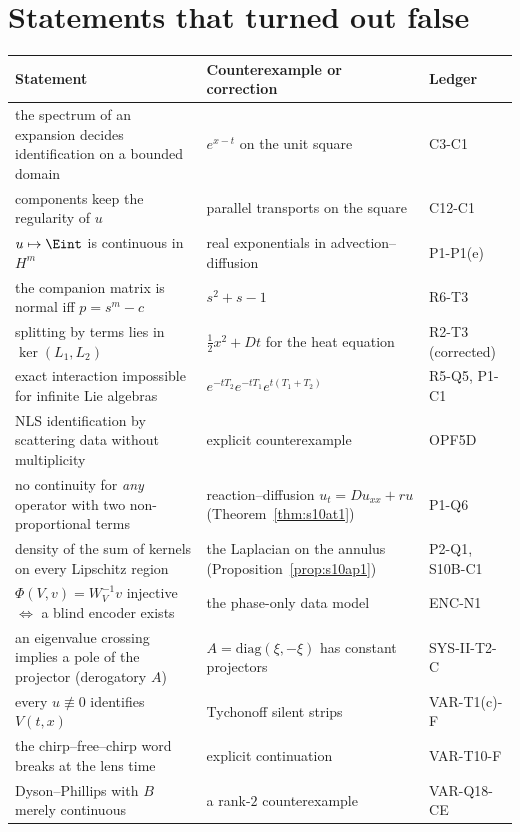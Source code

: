 \section{Statements that turned out false}

\begin{center}\small
\begin{tabular}{@{}L{5.2cm}L{6.0cm}L{2.6cm}@{}}
\toprule
Statement & Counterexample or correction & Ledger\\\midrule
the spectrum of an expansion decides identification on a bounded domain & $e^{x-t}$ on the unit square & C3-C1\\
components keep the regularity of $u$ & parallel transports on the square & C12-C1\\
$u\mapsto\Eint$ is continuous in $H^m$ & real exponentials in advection--diffusion & P1-P1(e)\\
the companion matrix is normal iff $p=s^m-c$ & $s^2+s-1$ & R6-T3\\
splitting by terms lies in $\ker(L_1,L_2)$ & $\tfrac12x^2+Dt$ for the heat equation & R2-T3 (corrected)\\
exact interaction impossible for infinite Lie algebras & $e^{-tT_2}e^{-tT_1}e^{t(T_1+T_2)}$ & R5-Q5, P1-C1\\
NLS identification by scattering data without multiplicity & explicit counterexample & OPF5D\\
no continuity for \emph{any} operator with two non-proportional terms & reaction--diffusion $u_t=Du_{xx}+ru$ (Theorem~\ref{thm:s10at1}) & P1-Q6\\
density of the sum of kernels on every Lipschitz region & the Laplacian on the annulus (Proposition~\ref{prop:s10ap1}) & P2-Q1, S10B-C1\\
$\Phi(V,v)=W_V^{-1}v$ injective $\iff$ a blind encoder exists & the phase-only data model & ENC-N1\\
an eigenvalue crossing implies a pole of the projector (derogatory $A$) & $A=\mathrm{diag}(\xi,-\xi)$ has constant projectors & SYS-II-T2-C\\
every $u\not\equiv0$ identifies $V(t,x)$ & Tychonoff silent strips & VAR-T1(c)-F\\
the chirp--free--chirp word breaks at the lens time & explicit continuation & VAR-T10-F\\
Dyson--Phillips with $B$ merely continuous & a rank-$2$ counterexample & VAR-Q18-CE\\\bottomrule
\end{tabular}
\end{center}

